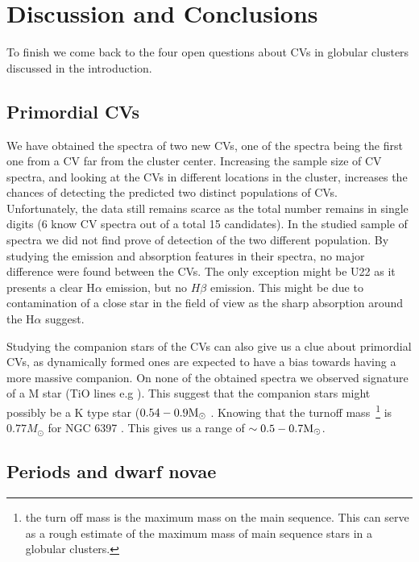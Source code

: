 \chapter{Discussion and Conclusions}\label{chap:conclu}
\thispagestyle{fancy}

To finish we come back to the four open questions about CVs in globular clusters discussed in the introduction. 

\section{Primordial CVs}

We have obtained the spectra of two new CVs, one of the spectra being the first one from a CV far from the cluster center. Increasing the sample size of CV spectra, and looking at the CVs in different locations in the cluster, increases the chances of detecting the predicted two distinct populations of CVs. Unfortunately, the data still remains scarce as the total number remains in single digits (6 know CV spectra out of a total 15 candidates). In the studied sample of spectra we did not find prove of detection of the two different population. By studying the emission and absorption features in their spectra, no major difference were found between the CVs. The only exception might be U22 as it presents a clear H$\alpha$ emission, but no $H\beta$ emission. This might be due to contamination of a close star in the field of view as the sharp absorption around the H$\alpha$ suggest.  

Studying the companion stars of the CVs can also give us a clue about primordial CVs, as dynamically formed ones are expected to have a bias towards having a more massive companion. On none of the obtained spectra we observed signature of a M star (TiO lines e.g \citep{Marsh_secondary_1990}). This suggest that the companion stars might possibly be a K type star ($0.54 - 0.9 \text M _\odot$ \citep{gray2005observation}. Knowing that the turnoff mass~\footnote{the turn off mass is the maximum mass on the main sequence. This can serve as a rough estimate of the maximum mass of main sequence stars in a globular clusters.} is $0.77 M_\odot$ for NGC 6397 \citep{de_marco_spectroscopic_2005}. This gives us a range of $\sim 0.5 - 0.7 \text M _\odot$. 

\section{Periods and dwarf novae}

